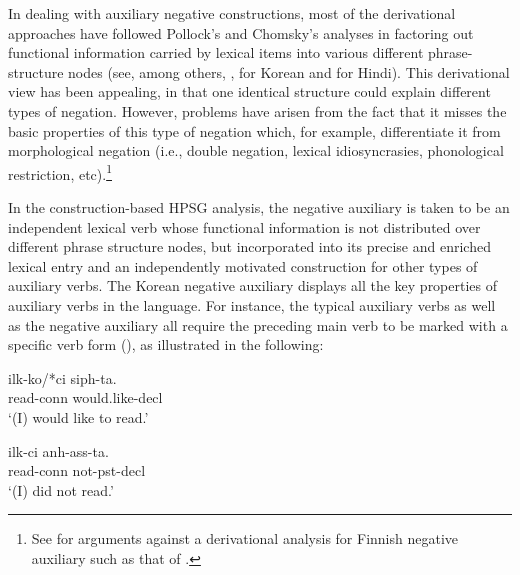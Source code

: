 \documentclass[output=paper]{langsci/langscibook}
\begin{document}
{In dealing with auxiliary negative constructions,
most of the derivational approaches have
followed Pollock's and Chomsky's analyses in factoring out functional
information carried by lexical items into
various different phrase-structure nodes (see, among others, \citet{Hagstrom:97,Hagstrom:02}, \citet{Han:07} for Korean and \citet{Vasishth:00} for Hindi).
%
%
This derivational view has
been appealing, in that one identical structure could explain
different types of negation.   However,
problems have arisen from the fact that it misses the basic properties
of this type of negation which, for example, differentiate it from
morphological negation (i.e., double negation, lexical
idiosyncrasies, phonological restriction, etc).\footnote{See \citet{Nino:94} for arguments against a derivational analysis
for Finnish negative auxiliary such as that of \citet{Mitchell:91}.}


In the construction-based HPSG analysis, the
negative auxiliary is taken to be an independent lexical
verb whose functional information is not distributed
over different phrase structure nodes, but incorporated into
its precise and enriched lexical entry and an independently
motivated construction for other types of auxiliary verbs.
The Korean negative auxiliary displays all the key properties of auxiliary verbs in the language. For instance, the typical auxiliary verbs as
well as the negative auxiliary all require the preceding main verb to be marked with a specific verb form (\vform), as illustrated
in the following:





\eal
\ex\label{14a}
\gll ilk-ko/*ci siph-ta. \\
     read-{\sc conn} would.like-{\sc decl} \\
\glt `(I) would like to read.'

\ex\label{14b}
\gll ilk-ci anh-ass-ta. \\
     read-{\sc conn} not-{\sc pst}-{\sc decl} \\
\glt `(I) did not read.'
\zl


}
\end{document}
